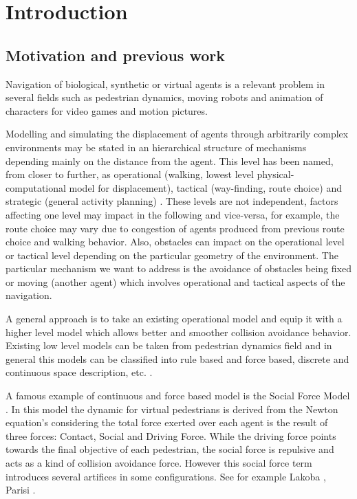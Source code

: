 \documentclass[english]{article}
\begin{document}
\section{Introduction}
    
    \subsection{Motivation and previous work}
    
    Navigation of biological, synthetic or virtual agents is a relevant
    problem in several fields such as pedestrian dynamics, moving robots
    and animation of characters for video games and motion pictures.
    
    Modelling and simulating the displacement of agents through arbitrarily
    complex environments may be stated in an hierarchical structure of
    mechanisms depending mainly on the distance from the agent. This level
    has been named, from closer to further, as operational (walking, lowest
    level physical-computational model for displacement), tactical (way-finding,
    route choice) and strategic (general activity planning) \cite{key-hoog2004}.
    These levels are not independent, factors affecting one level may
    impact in the following and vice-versa, for example, the route choice
    may vary due to congestion of agents produced from previous route
    choice and walking behavior. Also, obstacles can impact on the operational
    level or tactical level depending on the particular geometry of the
    environment. The particular mechanism we want to address is the avoidance
    of obstacles being fixed or moving (another agent) which involves
    operational and tactical aspects of the navigation.
    
    A general approach is to take an existing operational model and equip
    it with a higher level model which allows better and smoother collision
    avoidance behavior. Existing low level models can be taken from pedestrian
    dynamics field and in general this models can be classified into rule
    based and force based, discrete and continuous space description,
    etc. \cite{key-scha2009}.
    
    A famous example of continuous and force based model is the Social
    Force Model \cite{key-helb1995,key-helb2000}. In this model the dynamic
    for virtual pedestrians is derived from the Newton equation's considering
    the total force exerted over each agent is the result of three forces:
    Contact, Social and Driving Force. While the driving force points
    towards the final objective of each pedestrian, the social force is
    repulsive and acts as a kind of collision avoidance force. However
    this social force term introduces several artifices in some configurations.
    See for example Lakoba \cite{key-tara2005}, Parisi \cite{key-pari2009}.
    
\end{document}
